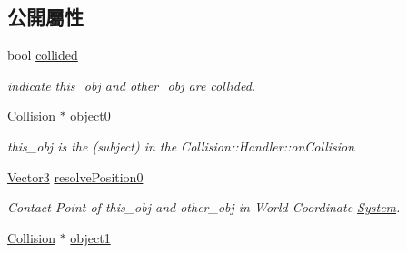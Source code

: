 \subsection*{公開屬性}
\begin{DoxyCompactItemize}
\item 
bool \hyperlink{class_i_dream_sky_1_1_collision_1_1_contact_info_a210192565d2877d618d0a9c048a464b6}{collided}\hypertarget{class_i_dream_sky_1_1_collision_1_1_contact_info_a210192565d2877d618d0a9c048a464b6}{}\label{class_i_dream_sky_1_1_collision_1_1_contact_info_a210192565d2877d618d0a9c048a464b6}

\begin{DoxyCompactList}\small\item\em indicate this\+\_\+obj and other\+\_\+obj are collided. \end{DoxyCompactList}\item 
\hyperlink{class_i_dream_sky_1_1_collision}{Collision} $\ast$ \hyperlink{class_i_dream_sky_1_1_collision_1_1_contact_info_a06b949cdbd47915bc514ad43a999a471}{object0}\hypertarget{class_i_dream_sky_1_1_collision_1_1_contact_info_a06b949cdbd47915bc514ad43a999a471}{}\label{class_i_dream_sky_1_1_collision_1_1_contact_info_a06b949cdbd47915bc514ad43a999a471}

\begin{DoxyCompactList}\small\item\em this\+\_\+obj is the (subject) in the Collision\+::\+Handler\+::on\+Collision \end{DoxyCompactList}\item 
\hyperlink{class_i_dream_sky_1_1_vector3}{Vector3} \hyperlink{class_i_dream_sky_1_1_collision_1_1_contact_info_a14c77d5c5d1c064f65d60b9954919370}{resolve\+Position0}\hypertarget{class_i_dream_sky_1_1_collision_1_1_contact_info_a14c77d5c5d1c064f65d60b9954919370}{}\label{class_i_dream_sky_1_1_collision_1_1_contact_info_a14c77d5c5d1c064f65d60b9954919370}

\begin{DoxyCompactList}\small\item\em Contact Point of this\+\_\+obj and other\+\_\+obj in World Coordinate \hyperlink{class_i_dream_sky_1_1_system}{System}. \end{DoxyCompactList}\item 
\hyperlink{class_i_dream_sky_1_1_collision}{Collision} $\ast$ \hyperlink{class_i_dream_sky_1_1_collision_1_1_contact_info_aadedcc41354d289a3df37eb4119e1c14}{object1}\hypertarget{class_i_dream_sky_1_1_collision_1_1_contact_info_aadedcc41354d289a3df37eb4119e1c14}{}\label{class_i_dream_sky_1_1_collision_1_1_contact_info_aadedcc41354d289a3df37eb4119e1c14}


\end{DoxyCompactItemize}
